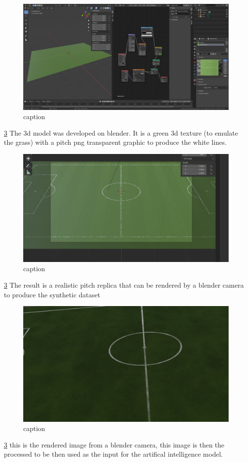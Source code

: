 \documentclass[
11pt,
twoside
]{report}
\begin{document}
\begin{figure}[H]
    \includegraphics[keepaspectratio, width=\columnwidth]{Screenshot_from_2021-10-22_13-59-52.png}
    \caption{caption}
    \label{img:1}
\end{figure}
\ref{img:1} The 3d model was developed on blender. It is a green 3d texture (to emulate the grass) with a pitch png transparent graphic to produce the white lines.

\begin{figure}[H]
    \includegraphics[keepaspectratio, width=\columnwidth]{Screenshot_2021-12-17_19-08-06.png}
    \caption{caption}
    \label{img:1}
\end{figure}
\ref{img:1} The result is a realistic pitch replica that can be rendered by a blender camera to produce the synthetic dataset


\begin{figure}[H]
    \includegraphics[keepaspectratio, width=\columnwidth]{image.png}
    \caption{caption}
    \label{img:1}
\end{figure}
\ref{img:1} this is the rendered image from a blender camera, this image is then the processed to be then used as the input for the artifical intelligence model.
\end{document}
